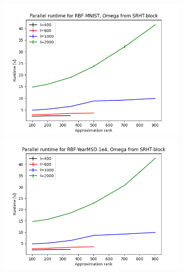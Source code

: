\documentclass{article}
\theoremstyle{definition}
\begin{document}

\begin{figure}
\centering
\hfill\begin{subfigure}[t]{\textwidth+20pt\relax}
    \includegraphics[width=\dimexpr\linewidth-20pt\relax]{plots/runtime_new/runtime_par_RBF-MNIST_SRHT-block.png}
    \includegraphics[width=\dimexpr\linewidth-20pt\relax]{plots/runtime_new/runtime_par_RBF-YearMSD-1e4_SRHT-block.png}

\end{subfigure}
\end{figure}
\end{document}
